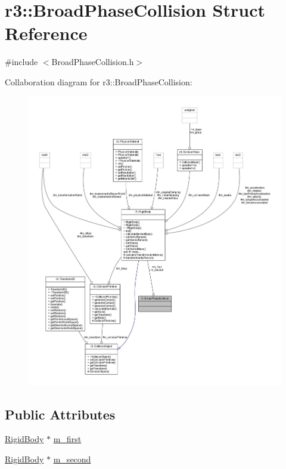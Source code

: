 \hypertarget{structr3_1_1_broad_phase_collision}{}\section{r3\+:\+:Broad\+Phase\+Collision Struct Reference}
\label{structr3_1_1_broad_phase_collision}


{\ttfamily \#include $<$Broad\+Phase\+Collision.\+h$>$}



Collaboration diagram for r3\+:\+:Broad\+Phase\+Collision\+:\nopagebreak
\begin{figure}[H]
\begin{center}
\leavevmode
\includegraphics[width=350pt]{structr3_1_1_broad_phase_collision__coll__graph}
\end{center}
\end{figure}
\subsection*{Public Attributes}
\begin{DoxyCompactItemize}
\item 
\mbox{\hyperlink{classr3_1_1_rigid_body}{Rigid\+Body}} $\ast$ \mbox{\hyperlink{structr3_1_1_broad_phase_collision_a0fdb5a3015199eaf3a21ad9434078362}{m\+\_\+first}}
\item 
\mbox{\hyperlink{classr3_1_1_rigid_body}{Rigid\+Body}} $\ast$ \mbox{\hyperlink{structr3_1_1_broad_phase_collision_a08dcc5e2d352b0cf6fbe679804700731}{m\+\_\+second}}
\end{DoxyCompactItemize}


